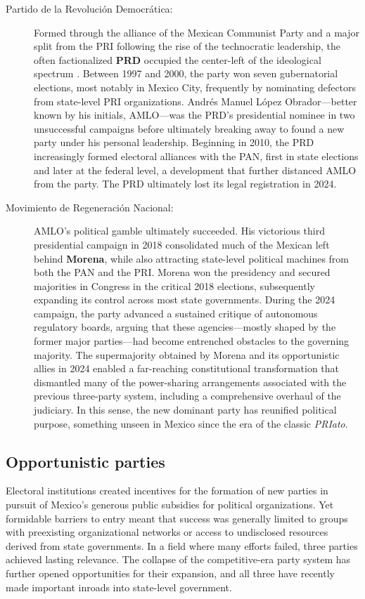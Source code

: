 \documentclass[letter,12pt]{article}
\begin{document}
\begin{description}
\item[Partido de la Revolución Democrática:] Formed through the alliance of the Mexican Communist Party and a major split from the PRI following the rise of the technocratic leadership, the often factionalized \textbf{PRD} occupied the center-left of the ideological spectrum \citep{bruhn.1997, cantuCSG2019apsr}. Between 1997 and 2000, the party won seven gubernatorial elections, most notably in Mexico City, frequently by nominating defectors from state-level PRI organizations. Andrés Manuel López Obrador---better known by his initials, AMLO---was the PRD's presidential nominee in two unsuccessful campaigns before ultimately breaking away to found a new party under his personal leadership. Beginning in 2010, the PRD increasingly formed electoral alliances with the PAN, first in state elections and later at the federal level, a development that further distanced AMLO from the party. The PRD ultimately lost its legal registration in 2024.

\item[Movimiento de Regeneración Nacional:] AMLO's political gamble ultimately succeeded. His victorious third presidential campaign in 2018 consolidated much of the Mexican left behind \textbf{Morena}, while also attracting state-level political machines from both the PAN and the PRI. Morena won the presidency and secured majorities in Congress in the critical 2018 elections, subsequently expanding its control across most state governments. During the 2024 campaign, the party advanced a sustained critique of autonomous regulatory boards, arguing that these agencies---mostly shaped by the former major parties---had become entrenched obstacles to the governing majority. The supermajority obtained by Morena and its opportunistic allies in 2024 enabled a far-reaching constitutional transformation that dismantled many of the power-sharing arrangements associated with the previous three-party system, including a comprehensive overhaul of the judiciary. In this sense, the new dominant party has reunified political purpose, something unseen in Mexico since the era of the classic \emph{PRIato}.
  
\end{description}

\subsection{Opportunistic parties}

Electoral institutions created incentives for the formation of new parties in pursuit of Mexico's generous public subsidies for political organizations. Yet formidable barriers to entry meant that success was generally limited to groups with preexisting organizational networks or access to undisclosed resources derived from state governments. In a field where many efforts failed, three parties achieved lasting relevance. The collapse of the competitive-era party system has further opened opportunities for their expansion, and all three have recently made important inroads into state-level government.
\end{document}
